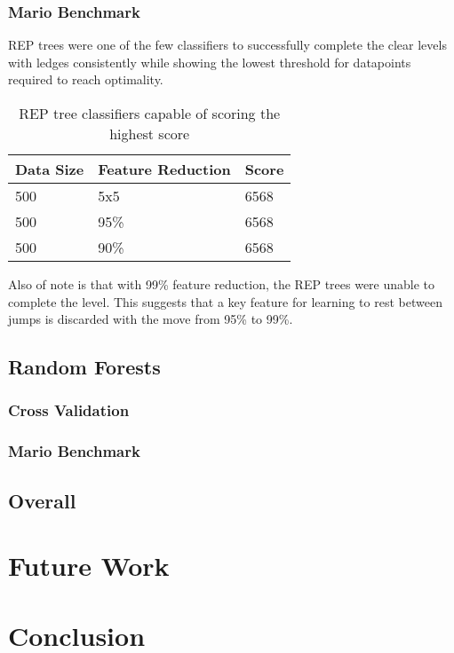 \documentclass[]{article}   %
\begin{document}
\subsubsection{Mario Benchmark}
REP trees were one of the few classifiers to successfully complete the clear levels with ledges consistently while showing the lowest threshold for
datapoints required to reach optimality. 

\begin{table}[h!]
	\begin{center}
		\caption{REP tree classifiers capable of scoring the highest score}
		\begin{tabular}{l | l || l  }
		\hline
		Data Size & Feature Reduction & Score \\
		\hline
		500 & 5x5 & 6568 \\
		500 & 95\% & 6568 \\
		500 & 90\% & 6568 \\
		\hline
		\end{tabular}
	\end{center}
\end{table}

Also of note is that with 99\% feature reduction, the REP trees were unable to complete the level. This suggests that a key feature for learning to 
rest between jumps is discarded with the move from 95\% to 99\%.

\subsection{Random Forests}
\subsubsection{Cross Validation}

\subsubsection{Mario Benchmark}

\subsection{Overall}

\section{Future Work}

\section{Conclusion}
\end{document}
